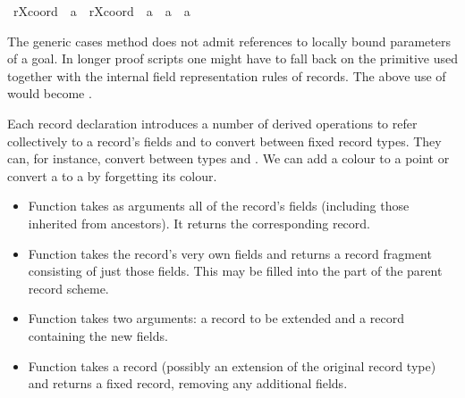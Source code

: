 \begin{isabellebody}
\begin{isamarkuptext}
\end{isamarkuptext}%
\isamarkuptrue%
\ {\isachardoublequote}r{\isasymlparr}Xcoord\ {\isacharcolon}{\isacharequal}\ a{\isasymrparr}\ {\isacharequal}\ r{\isasymlparr}Xcoord\ {\isacharcolon}{\isacharequal}\ a{\isacharprime}{\isasymrparr}\ {\isasymLongrightarrow}\ a\ {\isacharequal}\ a{\isacharprime}{\isachardoublequote}\isamarkupfalse%
\isamarkuptrue%
\isamarkupfalse%
\isamarkuptrue%
\isamarkupfalse%
\isamarkupfalse%
%
\begin{isamarkuptext}%
The generic cases method does not admit references to locally bound
  parameters of a goal.  In longer proof scripts one might have to
  fall back on the primitive  used together with the
  internal field representation rules of records.  The above use of
   would become .%
\end{isamarkuptext}%
\isamarkuptrue%
%
\isamarkuptrue%
%
\begin{isamarkuptext}%
Each record declaration introduces a number of derived operations to
  refer collectively to a record's fields and to convert between fixed
  record types.  They can, for instance, convert between types  and .  We can add a colour to a point or convert
  a  to a  by forgetting its colour.

  \begin{itemize}

  \item Function  takes as arguments all of the record's
  fields (including those inherited from ancestors).  It returns the
  corresponding record.

  \item Function  takes the record's very own fields and
  returns a record fragment consisting of just those fields.  This may
  be filled into the  part of the parent record scheme.

  \item Function  takes two arguments: a record to be
  extended and a record containing the new fields.

  \item Function  takes a record (possibly an extension
  of the original record type) and returns a fixed record, removing
  any additional fields.


\end{itemize}
\end{isamarkuptext}
\end{isabellebody}
